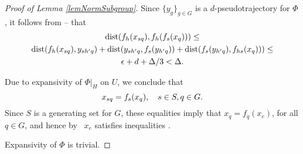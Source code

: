 \begin{proof}[Proof of Lemma \ref{lemNormSubgroup}]
Since $\{y_g\}_{g\in G}$ is a $d$-pseudotrajectory for $\Phi$, it follows from -- that
\begin{multline*}
\operatorname{dist}(f_{h}(x_{sq}),f_{h}(f_s(x_q)))\leq \\ \operatorname{dist}(f_{h}(x_{sq}), y_{sh'q}) + \operatorname{dist}(y_{sh'q}, f_{s}(y_{h'q}))+
\operatorname{dist}(f_{s}(y_{h'q}), f_{hs}(x_q)))\leq \\ \epsilon + d + \Delta/3 < \Delta.
\end{multline*}

Due to expansivity of $\Phi|_{H}$ on $U$, we conclude that
\begin{equation}\notag
\label{goal}
x_{sq} = f_s(x_q), \quad s \in S, q \in G.
\end{equation}
Since $S$ is a generating set for $G$, these equalities imply that
$x_q = f_q(x_e)$, for  all $q \in G$, and hence by~  $x_e$ satisfies inequalities .

Expansivity of $\Phi$ is trivial.
\end{proof}








